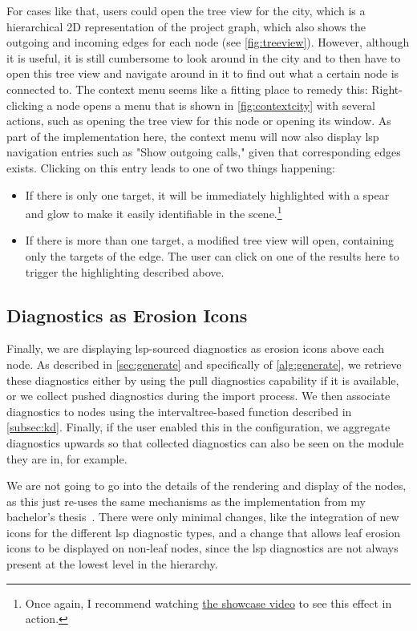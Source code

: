 \documentclass[../thesis]{subfiles}
\begin{document}
For cases like that, users could open the tree view for the city, which is a hierarchical 2D representation of the project graph, which also shows the outgoing and incoming edges for each node (see \cref{fig:treeview}).
However, although it is useful, it is still cumbersome to look around in the city and to then have to open this tree view and navigate around in it to find out what a certain node is connected to.
The context menu seems like a fitting place to remedy this:
Right-clicking a node opens a menu that is shown in \cref{fig:contextcity} with several actions, such as opening the tree view for this node or opening its \gls{window}.
As part of the implementation here, the context menu will now also display \gls{lsp} navigation entries such as "Show outgoing calls," given that corresponding edges exists.
Clicking on this entry leads to one of two things happening:
\begin{itemize}
	\item If there is only one target, it will be immediately highlighted with a spear and glow to make it easily identifiable in the scene.\footnote{
		      Once again, I recommend watching \href{https://www.youtube.com/watch?v=yAzyv2_q2ng}{the showcase video} to see this effect in action.
	      }
	\item If there is more than one target, a modified tree view will open, containing only the targets of the edge.
	      The user can click on one of the results here to trigger the highlighting described above.
\end{itemize}

\subsection{Diagnostics as Erosion Icons}
Finally, we are displaying \gls{lsp}-sourced diagnostics as erosion icons above each node.
As described in \cref{sec:generate} and specifically  of \cref{alg:generate}, we retrieve these diagnostics either by using the pull diagnostics \gls{capability} if it is available, or we collect pushed diagnostics during the import process.
We then associate diagnostics to nodes using the \gls{intervaltree}-based function described in \cref{subsec:kd}.
Finally, if the user enabled this in the configuration, we aggregate diagnostics upwards so that collected diagnostics can also be seen on the module they are in, for example.

We are not going to go into the details of the rendering and display of the nodes, as this just re-uses the same mechanisms as the implementation from my bachelor's thesis~\cite[section~3.3]{galperin2021}.
There were only minimal changes, like the integration of new icons for the different \gls{lsp} diagnostic types, and a change that allows leaf erosion icons to be displayed on non-leaf nodes, since the \gls{lsp} diagnostics are not always present at the lowest level in the hierarchy.
\end{document}
